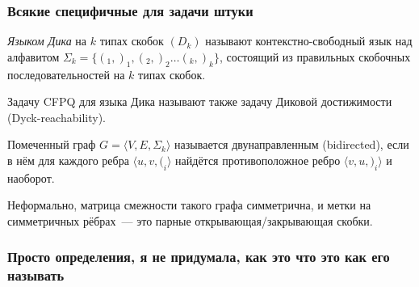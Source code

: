 \subsubsection{Всякие специфичные для задачи штуки}

\begin{definition}
    \textit{Языком Дика} на $k$ типах скобок $(D_k)$ называют контекстно-свободный язык над алфавитом $\Sigma_k = \{ (_1, )_1, (_2, )_2 \dots (_k, )_k \}$, состоящий из правильных скобочных последовательностей на $k$ типах скобок.

    Задачу CFPQ для языка Дика называют также задачу Диковой достижимости (Dyck-reachability).
\end{definition}

\begin{definition}

\TODO

\end{definition}

\begin{definition}
    Помеченный граф $G = \langle V, E, \Sigma_k \rangle$ называется двунаправленным (bidirected), если в нём для каждого ребра $\langle u, v, (_i \rangle$ найдётся противоположное ребро $\langle v, u, )_i \rangle$ и наоборот.

    Неформально, матрица смежности такого графа симметрична, и метки на симметричных рёбрах~--- это парные открывающая/закрывающая скобки.
\end{definition}

\subsubsection{Просто определения, я не придумала, как это что это как его называть}

\begin{definition}
    \TODO
\end{definition}
